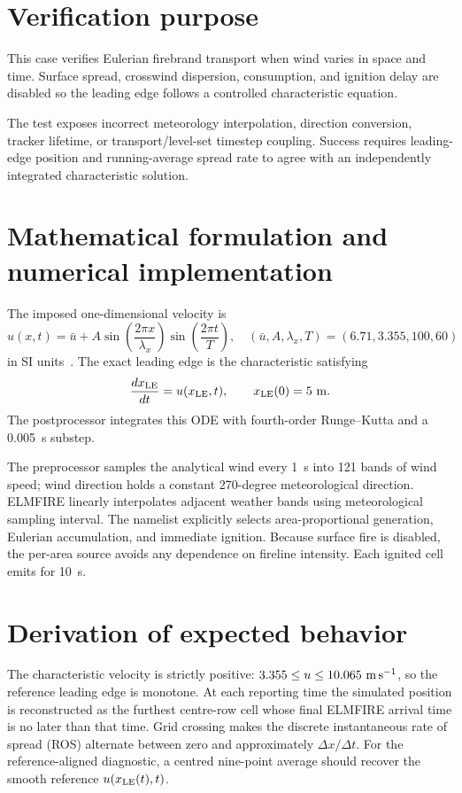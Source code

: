 \section{Verification purpose}

This case verifies Eulerian firebrand transport when wind varies in space and time. Surface spread, crosswind dispersion, consumption, and ignition delay are disabled so the leading edge follows a controlled characteristic equation.

The test exposes incorrect meteorology interpolation, direction conversion, tracker lifetime, or transport/level-set timestep coupling. Success requires leading-edge position and running-average spread rate to agree with an independently integrated characteristic solution.

\section{Mathematical formulation and numerical implementation}
The imposed one-dimensional velocity is
\begin{equation}
 u(x,t)=\bar u+A\sin\left(\frac{2\pi x}{\lambda_x}\right)
                 \sin\left(\frac{2\pi t}{T}\right),
 \quad
 (\bar u,A,\lambda_x,T)=(6.71,3.355,100,60)
\end{equation}
in SI units~\cite{Qin2025}. The exact leading edge is the characteristic satisfying
\begin{equation}
 \frac{dx_{\rm LE}}{dt}=u(x_{\rm LE},t),\qquad x_{\rm LE}(0)=5~{\rm m}.
\end{equation}
The postprocessor integrates this ODE with fourth-order Runge--Kutta and a
\SI{0.005}{s} substep.

The preprocessor samples the analytical wind every \SI{1}{s} into 121 bands of
wind speed; wind direction holds a constant 270-degree meteorological
direction. ELMFIRE linearly interpolates adjacent weather bands using
meteorological sampling interval. The namelist explicitly selects area-proportional
generation, Eulerian accumulation, and immediate ignition.
Because surface fire is disabled, the per-area source avoids any dependence on
fireline intensity. Each ignited cell emits for \SI{10}{s}.

\section{Derivation of expected behavior}
The characteristic velocity is strictly positive:
$3.355\le u\le10.065~{\rm m\,s^{-1}}$, so the reference leading edge is
monotone. At each reporting time the simulated position is reconstructed as the
furthest centre-row cell whose final ELMFIRE arrival time is no later than that
time. Grid crossing makes the discrete instantaneous rate of spread (ROS) alternate between zero
and approximately $\Delta x/\Delta t$. For the reference-aligned diagnostic, a centred
nine-point average should recover the smooth reference $u(x_{\rm LE}(t),t)$.


